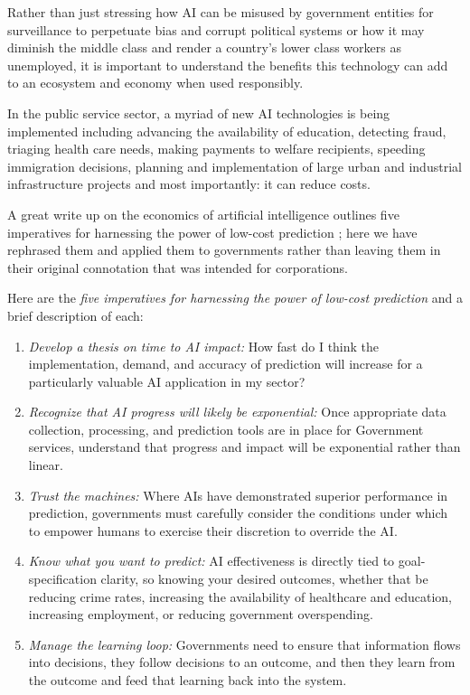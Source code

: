 \documentclass[conference]{IEEEtran}
\begin{document}
Rather than just stressing how AI can be misused by government entities for surveillance to perpetuate bias and corrupt political systems or how it may diminish the middle class and render a country's lower class workers as unemployed, it is important to understand the benefits this technology can add to an ecosystem and economy when used responsibly.

In the public service sector, a myriad of new AI technologies is being implemented including advancing the availability of education, detecting fraud, triaging health care needs, making payments to welfare recipients, speeding immigration decisions, planning and implementation of large urban and industrial infrastructure projects and most importantly: it can reduce costs.

A great write up on the economics of artificial intelligence outlines five imperatives for harnessing the power of low-cost prediction \cite{agrawal2018economics}; here we have rephrased them and applied them to governments rather than leaving them in their original connotation that was intended for corporations. 

Here are the \emph{five imperatives for harnessing the power of low-cost prediction} and a brief description of each:
\begin{enumerate}
  \item \emph{Develop a thesis on time to AI impact:} How fast do I think the implementation, demand, and accuracy of prediction will increase for a particularly valuable AI application in my sector?
  \item \emph{Recognize that AI progress will likely be exponential:} Once appropriate data collection, processing, and prediction tools are in place for Government services, understand that progress and impact will be exponential rather than linear.
  \item \emph{Trust the machines:} Where AIs have demonstrated superior performance in prediction, governments must carefully consider the conditions under which to empower humans to exercise their discretion to override the AI.
  \item \emph{Know what you want to predict:} AI effectiveness is directly tied to goal-specification clarity, so knowing your desired outcomes, whether that be reducing crime rates, increasing the availability of healthcare and education, increasing employment, or reducing government overspending.
  \item \emph{Manage the learning loop:} Governments need to ensure that information flows into decisions, they follow decisions to an outcome, and then they learn from the outcome and feed that learning back into the system.
\end{enumerate}
\end{document}
